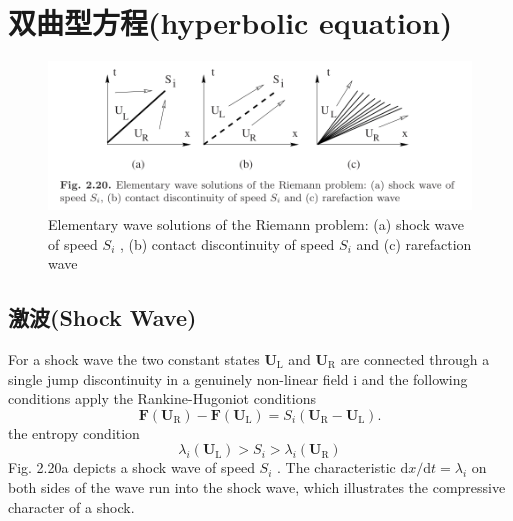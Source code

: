 \documentclass{book}
\begin{document}
\section{双曲型方程(hyperbolic equation)}
\begin{figure}[htp]
    \centering
    \label{fig:间断波}
    \includegraphics[width=0.7\linewidth]{fig/间断波.png}
    \caption{Elementary wave solutions of the Riemann problem: (a) shock wave of speed  $S_{i}$ , (b) contact discontinuity of speed  $S_{i}$  and (c) rarefaction wave}
\end{figure}

\subsection{激波(Shock Wave)}
For a shock wave the two constant states  $\mathbf{U}_{\mathrm{L}}$  and  $\mathbf{U}_{\mathrm{R}}$  are connected through a single jump discontinuity in a genuinely non-linear field  i  and the following conditions apply
the Rankine-Hugoniot conditions
\begin{equation}
    \mathbf{F}\left(\mathbf{U}_{\mathrm{R}}\right)-\mathbf{F}\left(\mathbf{U}_{\mathrm{L}}\right)=S_{i}\left(\mathbf{U}_{\mathrm{R}}-\mathbf{U}_{\mathrm{L}}\right) .
\end{equation}
the entropy condition
\begin{equation}
    \lambda_{i}\left(\mathbf{U}_{\mathrm{L}}\right)>S_{i}>\lambda_{i}\left(\mathbf{U}_{\mathrm{R}}\right)
\end{equation}
Fig. 2.20a depicts a shock wave of speed  $S_{i}$ . The characteristic  $\mathrm{d} x / \mathrm{d} t=\lambda_{i}$  on both sides of the wave run into the shock wave, which illustrates the compressive character of a shock.
\end{document}
